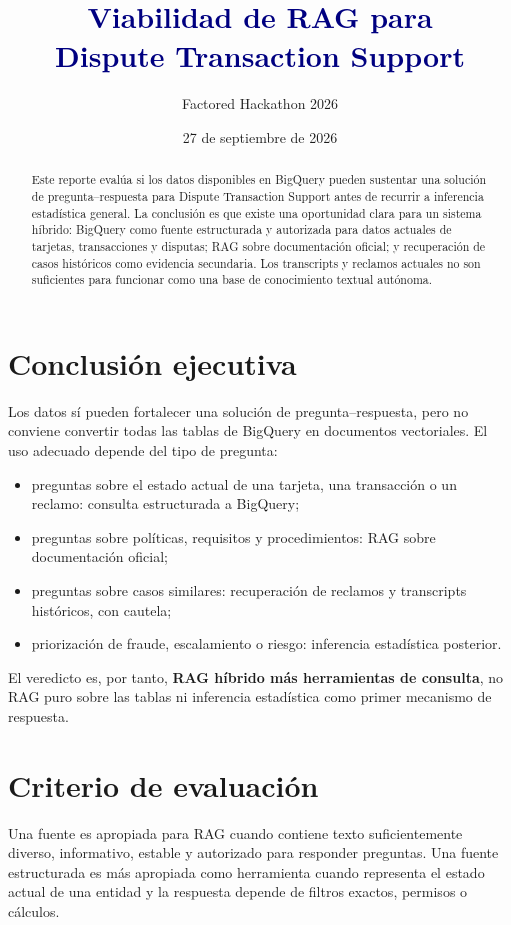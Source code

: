 \documentclass[11pt,a4paper]{article}
\title{\textcolor{navy}{Viabilidad de RAG para\\[2pt] Dispute Transaction Support}}
\author{Factored Hackathon 2026}
\date{27 de septiembre de 2026}
\begin{document}
\maketitle

\begin{abstract}
Este reporte evalúa si los datos disponibles en BigQuery pueden sustentar una solución de pregunta--respuesta para Dispute Transaction Support antes de recurrir a inferencia estadística general. La conclusión es que existe una oportunidad clara para un sistema híbrido: BigQuery como fuente estructurada y autorizada para datos actuales de tarjetas, transacciones y disputas; RAG sobre documentación oficial; y recuperación de casos históricos como evidencia secundaria. Los transcripts y reclamos actuales no son suficientes para funcionar como una base de conocimiento textual autónoma.
\end{abstract}

\section{Conclusión ejecutiva}

Los datos sí pueden fortalecer una solución de pregunta--respuesta, pero no conviene convertir todas las tablas de BigQuery en documentos vectoriales. El uso adecuado depende del tipo de pregunta:

\begin{itemize}
  \item preguntas sobre el estado actual de una tarjeta, una transacción o un reclamo: consulta estructurada a BigQuery;
  \item preguntas sobre políticas, requisitos y procedimientos: RAG sobre documentación oficial;
  \item preguntas sobre casos similares: recuperación de reclamos y transcripts históricos, con cautela;
  \item priorización de fraude, escalamiento o riesgo: inferencia estadística posterior.
\end{itemize}

El veredicto es, por tanto, \textbf{RAG híbrido más herramientas de consulta}, no RAG puro sobre las tablas ni inferencia estadística como primer mecanismo de respuesta.

\section{Criterio de evaluación}

Una fuente es apropiada para RAG cuando contiene texto suficientemente diverso, informativo, estable y autorizado para responder preguntas. Una fuente estructurada es más apropiada como herramienta cuando representa el estado actual de una entidad y la respuesta depende de filtros exactos, permisos o cálculos.
\end{document}

